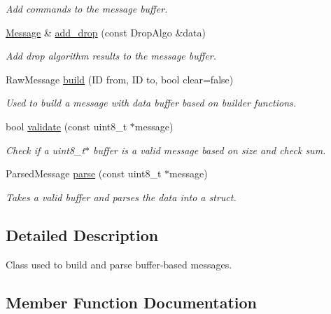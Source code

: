 \begin{DoxyCompactItemize}
\begin{DoxyCompactList}\small\item\em Add commands to the message buffer. \end{DoxyCompactList}\item 
\hyperlink{classaero_1_1Message}{Message} \& \hyperlink{classaero_1_1Message_a7363b2fdca085d956e1cced06d251fba}{add\+\_\+drop} (const Drop\+Algo \&data)
\begin{DoxyCompactList}\small\item\em Add drop algorithm results to the message buffer. \end{DoxyCompactList}\item 
Raw\+Message \hyperlink{classaero_1_1Message_a28a8ea9c02d4e64cc97ad3778b28005a}{build} (ID from, ID to, bool clear=false)
\begin{DoxyCompactList}\small\item\em Used to build a message with data buffer based on builder functions. \end{DoxyCompactList}\item 
bool \hyperlink{classaero_1_1Message_a2fcf820b38d5fb5a01db7c3ff0f23d98}{validate} (const uint8\+\_\+t $\ast$message)
\begin{DoxyCompactList}\small\item\em Check if a uint8\+\_\+t$\ast$ buffer is a valid message based on size and check sum. \end{DoxyCompactList}\item 
Parsed\+Message \hyperlink{classaero_1_1Message_a80fc3eb1adcb4ee2294c428847c98161}{parse} (const uint8\+\_\+t $\ast$message)
\begin{DoxyCompactList}\small\item\em Takes a valid buffer and parses the data into a struct. \end{DoxyCompactList}\end{DoxyCompactItemize}


\subsection{Detailed Description}
Class used to build and parse buffer-\/based messages. 

\subsection{Member Function Documentation}
\mbox{\label{classaero_1_1Message_a2788663a53895a6e6f5813f1da64d57d}} 
